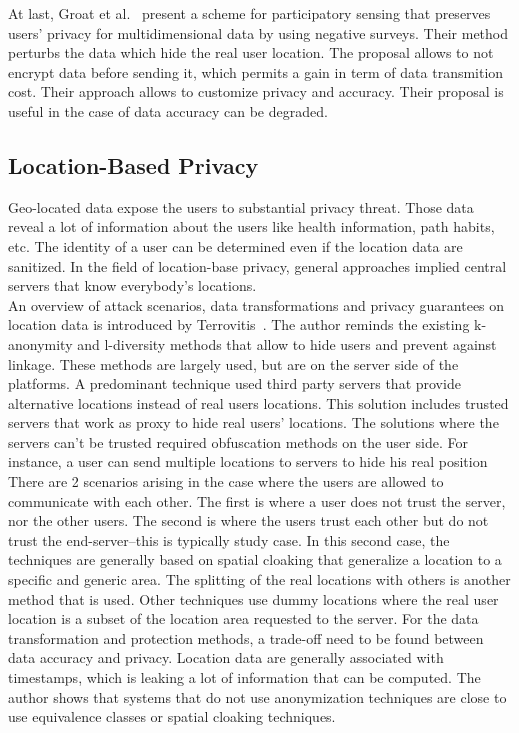 At last, Groat et al.~\cite{DBLP:conf/percom/GroatEHHF12} present a scheme for participatory sensing that preserves users' privacy for multidimensional data by using negative surveys.
Their method perturbs the data which hide the real user location.
The proposal allows to not encrypt data before sending it, which permits a gain in term of data transmition cost.
Their approach allows to customize privacy and accuracy.
Their proposal is useful in the case of data accuracy can be degraded.

\subsection{Location-Based Privacy}

Geo-located data expose the users to substantial privacy threat.
Those data reveal a lot of information about the users like health information, path habits, etc.
The identity of a user can be determined even if the location data are sanitized.
In the field of location-base privacy, general approaches implied central servers that know everybody's locations.
\\

An overview of attack scenarios, data transformations and privacy guarantees on location data is introduced by Terrovitis~\cite{DBLP:journals/sigkdd/Terrovitis11}.
The author reminds the existing k-anonymity and l-diversity methods that allow to hide users and prevent against linkage.
These methods are largely used, but are on the server side of the platforms.
A predominant technique used third party servers that provide alternative locations instead of real users locations.
This solution includes trusted servers that work as proxy to hide real users' locations.
The solutions where the servers can't be trusted required obfuscation methods on the user side.
For instance, a user can send multiple locations to servers to hide his real position
There are 2 scenarios arising in the case where the users are allowed to communicate with each other.
The first is where a user does not trust the server, nor the other users.
The second is where the users trust each other but do not trust the end-server--this is typically study case.
In this second case, the techniques are generally based on spatial cloaking that generalize a location to a specific and generic area.
The splitting of the real locations with others is another method that is used.
Other techniques use dummy locations where the real user location is a subset of the location area requested to the server.
For the data transformation and protection methods, a trade-off need to be found between data accuracy and privacy.
Location data are generally associated with timestamps, which is leaking a lot of information that can be computed.
The author shows that systems that do not use anonymization techniques are close to use equivalence classes or spatial cloaking techniques.
\\

